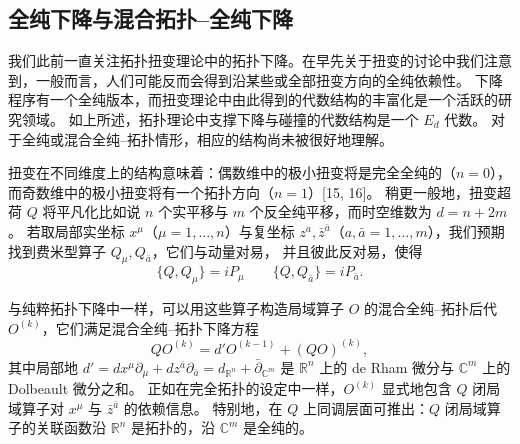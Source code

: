 \subsection{全纯下降与混合拓扑--全纯下降}

我们此前一直关注拓扑扭变理论中的拓扑下降。在早先关于扭变的讨论中我们注意到，一般而言，人们可能反而会得到沿某些或全部扭变方向的全纯依赖性。
下降程序有一个全纯版本，而扭变理论中由此得到的代数结构的丰富化是一个活跃的研究领域。
如上所述，拓扑理论中支撑下降与碰撞的代数结构是一个 $E_d$ 代数。
对于全纯或混合全纯–拓扑情形，相应的结构尚未被很好地理解。

扭变在不同维度上的结构意味着：偶数维中的极小扭变将是完全全纯的（$n=0$），而奇数维中的极小扭变将有一个拓扑方向（$n=1$）[15, 16]。
稍更一般地，扭变超荷 $Q$ 将平凡化比如说 $n$ 个实平移与 $m$ 个反全纯平移，而时空维数为 $d=n+2m$。
若取局部实坐标 $x^\mu$（$\mu=1,\dots,n$）与复坐标 $z^a,\bar z^{\bar a}$（$a,\bar a=1,\dots,m$），我们预期找到费米型算子 $Q_\mu,Q_{\bar a}$，它们与动量对易，%
并且彼此反对易，使得
\begin{equation}\tag{3.60}
\{Q,Q_\mu\}=iP_\mu \qquad \{Q,Q_{\bar a}\}=iP_{\bar a}.
\end{equation}

与纯粹拓扑下降中一样，可以用这些算子构造局域算子 $O$ 的混合全纯–拓扑后代 $O^{(k)}$，它们满足混合全纯–拓扑下降方程
\begin{equation}\tag{3.61}
QO^{(k)}=d'O^{(k-1)}+(QO)^{(k)},
\end{equation}
其中局部地 $d'=dx^\mu\partial_\mu+dz^{\bar a}\partial_{\bar a}=d_{\mathbb{R}^n}+\bar\partial_{\mathbb{C}^m}$ 是 $\mathbb{R}^n$ 上的 de Rham 微分与 $\mathbb{C}^m$ 上的 Dolbeault 微分之和。
正如在完全拓扑的设定中一样，$O^{(k)}$ 显式地包含 $Q$ 闭局域算子对 $x^\mu$ 与 $\bar z^{\bar a}$ 的依赖信息。
特别地，在 $Q$ 上同调层面可推出：$Q$ 闭局域算子的关联函数沿 $\mathbb{R}^n$ 是拓扑的，沿 $\mathbb{C}^m$ 是全纯的。


